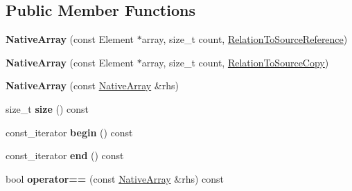 \subsection*{Public Member Functions}
\begin{DoxyCompactItemize}
\item 
\mbox{\label{classtesting_1_1internal_1_1_native_array_a52b3689c62532703d11e9d82939a7141}} 
{\bfseries Native\+Array} (const Element $\ast$array, size\+\_\+t count, \hyperlink{structtesting_1_1internal_1_1_relation_to_source_reference}{Relation\+To\+Source\+Reference})
\item 
\mbox{\label{classtesting_1_1internal_1_1_native_array_ac184ee5741af5be3402213819c834405}} 
{\bfseries Native\+Array} (const Element $\ast$array, size\+\_\+t count, \hyperlink{structtesting_1_1internal_1_1_relation_to_source_copy}{Relation\+To\+Source\+Copy})
\item 
\mbox{\label{classtesting_1_1internal_1_1_native_array_abb346ac3040f5da733f594cc2d5958bc}} 
{\bfseries Native\+Array} (const \hyperlink{classtesting_1_1internal_1_1_native_array}{Native\+Array} \&rhs)
\item 
\mbox{\label{classtesting_1_1internal_1_1_native_array_af96a4a5ca0cdd5d163c47a081f08bd89}} 
size\+\_\+t {\bfseries size} () const
\item 
\mbox{\label{classtesting_1_1internal_1_1_native_array_a3046d93cfa23097e7b7c91f5f982dc78}} 
const\+\_\+iterator {\bfseries begin} () const
\item 
\mbox{\label{classtesting_1_1internal_1_1_native_array_ae1cda748e49c6906421c6183c4d07c5a}} 
const\+\_\+iterator {\bfseries end} () const
\item 
\mbox{\label{classtesting_1_1internal_1_1_native_array_a81b90f5739ed812610e68dc34c9e3850}} 
bool {\bfseries operator==} (const \hyperlink{classtesting_1_1internal_1_1_native_array}{Native\+Array} \&rhs) const
\end{DoxyCompactItemize}
